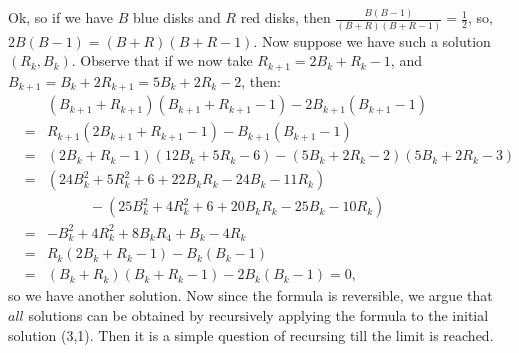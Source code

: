 Ok, so if we have $B$ blue disks and $R$ red disks, then $\tfrac{B(B-1)}{(B+R)(B+R-1)} = \tfrac 12$, so,
$2B(B-1) = (B+R)(B+R-1)$.  Now suppose we have such a solution $(R_k,B_k)$.  Observe that if we now take
$R_{k+1} = 2B_k+R_k-1$, and
$B_{k+1} = B_k+2R_{k+1} = 5B_k+2R_k-2$, then:
\begin{eqnarray*}
&&(B_{k+1}+R_{k+1})(B_{k+1}+R_{k+1}-1) -2B_{k+1}(B_{k+1}-1)  \\
&= &R_{k+1}(2B_{k+1}+R_{k+1}-1) - B_{k+1}(B_{k+1}-1)\\
&= &(2B_k+R_k-1)(12B_k+5R_k-6) - (5B_k+2R_k-2)(5B_k+2R_k-3) \\
&= &(24B_k^2 + 5R_k^2 + 6 + 22B_kR_k - 24 B_k - 11 R_k) \\
&&\qquad\quad - (25B_k^2 + 4R_k^2 + 6 + 20B_kR_k  - 25B_k - 10R_k)  \\
&= & -B_k^2 + 4R_k^2 + 8 B_kR_4 + B_k - 4 R_k \\
&= & R_k(2B_k+R_k -1) - B_k(B_k-1) \\
&= & (B_k+R_k)(B_k+R_k-1) - 2B_k(B_k-1) = 0,
\end{eqnarray*}
so we have another solution.  Now since the formula is reversible, we argue that $all$ solutions can be obtained by recursively applying the formula to the initial solution (3,1).  Then it is a simple question of recursing till the limit is reached.


